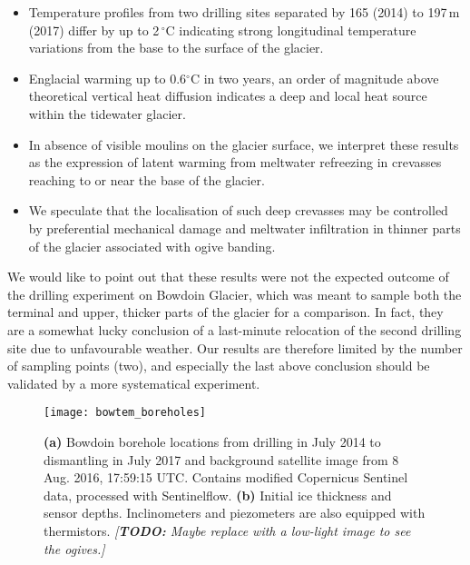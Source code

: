 \documentclass[utf8]{article}
\newcommand{\todo}[1]{\textcolor{c3}{\emph{[\textbf{TODO:} #1]}}}
\begin{document}
    \begin{itemize}

      \item Temperature profiles from two drilling sites separated by 165
        (2014) to 197\,m (2017) differ by up to 2\,$^\circ$C indicating strong
        longitudinal temperature variations from the base to the surface of
        the glacier.

      \item Englacial warming up to 0.6$^\circ$C in two years, an order of
        magnitude above theoretical vertical heat diffusion indicates a deep
        and local heat source within the tidewater glacier.

      \item In absence of visible moulins on the glacier surface, we interpret
        these results as the expression of latent warming from meltwater
        refreezing in crevasses reaching to or near the base of the glacier.

      \item We speculate that the localisation of such deep crevasses may be
        controlled by preferential mechanical damage and meltwater infiltration
        in thinner parts of the glacier associated with ogive banding.

    \end{itemize}

    We would like to point out that these results were not the expected outcome
    of the drilling experiment on Bowdoin Glacier, which was meant to sample
    both the terminal and upper, thicker parts of the glacier for a comparison.
    In fact, they are a somewhat lucky conclusion of a last-minute relocation
    of the second drilling site due to unfavourable weather. Our results are
    therefore limited by the number of sampling points (two), and especially
    the last above conclusion should be validated by a more systematical
    experiment.







\clearpage

    \begin{figure}
      \centerline{\texttt{[image: bowtem\_boreholes]}}
      \caption{%
        \textbf{(a)} Bowdoin borehole locations from drilling in July 2014 to
          dismantling in July 2017 and background satellite image from 8 Aug.
          2016, 17:59:15 UTC. Contains modified Copernicus Sentinel data,
          processed with Sentinelflow.
        \textbf{(b)} Initial ice thickness and sensor depths. Inclinometers
          and piezometers are also equipped with thermistors.
        \todo{Maybe replace with a low-light image to see the ogives.}}
      \label{fig:boreholes}
    \end{figure}
\end{document}

